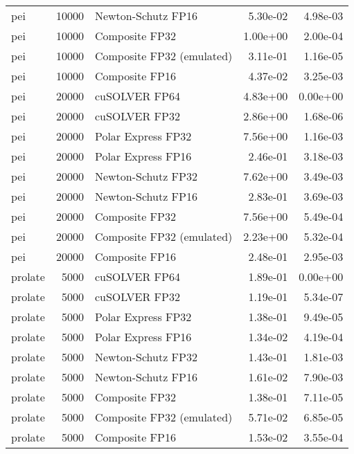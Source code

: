 \begin{table}
\begin{tabular}{lrlrr}
      pei & 10000 &        Newton-Schutz FP16 &  5.30e-02 &        4.98e-03 \\
      pei & 10000 &            Composite FP32 &  1.00e+00 &        2.00e-04 \\
      pei & 10000 & Composite FP32 (emulated) &  3.11e-01 &        1.16e-05 \\
      pei & 10000 &            Composite FP16 &  4.37e-02 &        3.25e-03 \\
      pei & 20000 &             cuSOLVER FP64 &  4.83e+00 &        0.00e+00 \\
      pei & 20000 &             cuSOLVER FP32 &  2.86e+00 &        1.68e-06 \\
      pei & 20000 &        Polar Express FP32 &  7.56e+00 &        1.16e-03 \\
      pei & 20000 &        Polar Express FP16 &  2.46e-01 &        3.18e-03 \\
      pei & 20000 &        Newton-Schutz FP32 &  7.62e+00 &        3.49e-03 \\
      pei & 20000 &        Newton-Schutz FP16 &  2.83e-01 &        3.69e-03 \\
      pei & 20000 &            Composite FP32 &  7.56e+00 &        5.49e-04 \\
      pei & 20000 & Composite FP32 (emulated) &  2.23e+00 &        5.32e-04 \\
      pei & 20000 &            Composite FP16 &  2.48e-01 &        2.95e-03 \\
  prolate &  5000 &             cuSOLVER FP64 &  1.89e-01 &        0.00e+00 \\
  prolate &  5000 &             cuSOLVER FP32 &  1.19e-01 &        5.34e-07 \\
  prolate &  5000 &        Polar Express FP32 &  1.38e-01 &        9.49e-05 \\
  prolate &  5000 &        Polar Express FP16 &  1.34e-02 &        4.19e-04 \\
  prolate &  5000 &        Newton-Schutz FP32 &  1.43e-01 &        1.81e-03 \\
  prolate &  5000 &        Newton-Schutz FP16 &  1.61e-02 &        7.90e-03 \\
  prolate &  5000 &            Composite FP32 &  1.38e-01 &        7.11e-05 \\
  prolate &  5000 & Composite FP32 (emulated) &  5.71e-02 &        6.85e-05 \\
  prolate &  5000 &            Composite FP16 &  1.53e-02 &        3.55e-04 \\

\end{tabular}
\end{table}

